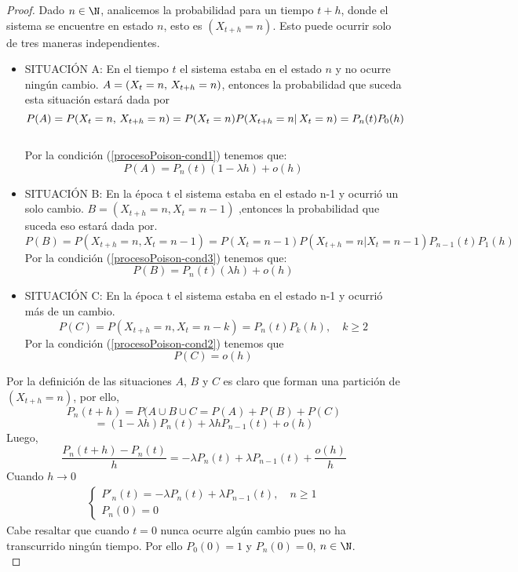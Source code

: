     \begin{proof}
        Dado $n\in\N$, analicemos la probabilidad para un tiempo $t+h$, donde el sistema se encuentre en estado $n$, esto es $(X_{t+h}=n)$. Esto puede ocurrir solo de tres maneras independientes.
        \begin{itemize}
            \item SITUACIÓN A: En el tiempo $t$ el sistema estaba en el estado $n$ y no ocurre ningún cambio. $A=(X_t=n,\thinspace X_{t+h}=n)$, entonces la probabilidad que suceda esta situación estará dada por $$P(A)=P(X_t=n,\thinspace X_{t+h}=n)=P(X_t=n)P(X_{t+h}=n|\thinspace X_{t}=n)=P_n(t)P_0(h)$$\\
            Por la condición (\ref{procesoPoison-cond1})
            tenemos que:
            $$P(A)=P_n(t)(1-\lambda h)+o(h)$$
            \item SITUACIÓN B: En la época t el sistema estaba en el estado n-1 y ocurrió un solo cambio. $B=(X_{t+h}=n, X_t=n-1)$ ,entonces la probabilidad que suceda eso estará dada por.
            $$P(B)=P(X_{t+h}=n, X_t=n-1)=P(X_t=n-1)P(X_{t+h}=n|X_t=n-1)P_{n-1}(t)P_1(h)$$
             Por la condición (\ref{procesoPoison-cond3})
            tenemos que:
            $$P(B)=P_n(t)(\lambda h)+o(h)$$
            \item SITUACIÓN C: En la época t el sistema estaba en el estado n-1 y ocurrió más de un cambio.
            $$P(C)=P(X_{t+h}=n, X_t=n-k)=P_n(t)P_k(h), \quad k\geq 2$$
             Por la condición (\ref{procesoPoison-cond2})
            tenemos que
            $$P(C)=o(h)$$
        \end{itemize}
        Por la definición de las situaciones $A$, $B$ y $C$ es claro que forman una partición de $(X_{t+h}=n)$, por ello, 
        $$P_n(t+h)=P(A\cup B\cup C=P(A)+P(B)+P(C)$$ $$=(1-\lambda h)P_n(t)+\lambda h P_{n-1}(t)+o(h)$$
        Luego, 
        $$\frac{P_n(t+h)-P_n(t)}{h}=-\lambda P_n(t)+\lambda P_{n-1}(t)+\frac{o(h)}{h}$$
        Cuando $h\rightarrow 0$
        \begin{eqnarray}
            \begin{cases}
                P'_n(t)=-\lambda P_n(t)+\lambda P_{n-1}(t),\quad n\geq 1\\
                P_n(0)=0
            \end{cases}
            \label{ProcPoison-edo-n}
        \end{eqnarray}
        Cabe resaltar que cuando $t=0$ nunca ocurre algún cambio pues no ha transcurrido ningún tiempo. Por ello $P_0(0)=1$ y $P_n(0)=0$, $n\in\N$. \\

\end{proof}
